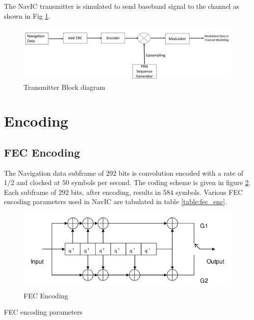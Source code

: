 The NavIC transmitter is simulated to send baseband signal to the channel as shown in Fig \ref{fig:trans_flow}. 

\begin{figure}[ht]
\centering
\includegraphics[width=1\columnwidth]{figs/trans_flow.jpg}
\centering
\captionsetup{justification=centering}
\caption{Transmitter Block diagram}
\label{fig:trans_flow}
\end{figure}


\section{Encoding}

\subsection{FEC Encoding}
The Navigation data subframe of $292$ bits is convolution encoded with a rate of 1/2 and clocked at $50$ symbols per second. The coding scheme is given in figure \ref{fig:FEC}. Each subframe of $292$ bits, after encoding, results in $584$ symbols. Various FEC encoding parameters used in NavIC are tabulated in table \ref{table:fec_enc}.
\begin{figure}[ht]
\centering
\includegraphics[width=\columnwidth]{figs/FEC.png}
\centering
\captionsetup{justification=centering}
\caption{FEC Encoding}
\label{fig:FEC}
\end{figure}

\begin{table}[h]

\vspace{3mm}
\caption{FEC encoding parameters}
\label{table:fec_enc}
\end{table}
